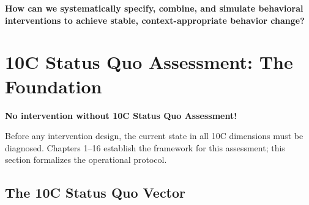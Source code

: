 \begin{tcolorbox}[colback=red!5!white, colframe=red!75!black,
    title=The Fundamental Question]
\textbf{How can we systematically specify, combine, and simulate behavioral interventions to achieve stable, context-appropriate behavior change?}
\end{tcolorbox}


\section{10C Status Quo Assessment: The Foundation}
\label{sec:hhh-status-quo}

\begin{tcolorbox}[colback=blue!5!white, colframe=blue!75!black,
    title=\textbf{CRITICAL: Diagnose BEFORE Intervention (Chapter 17, Section 0)}]
\textbf{No intervention without 10C Status Quo Assessment!}

Before any intervention design, the current state in all 10C dimensions must be diagnosed. Chapters 1--16 establish the framework for this assessment; this section formalizes the operational protocol.
\end{tcolorbox}

\subsection{The 10C Status Quo Vector}

